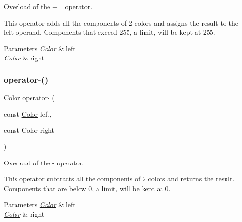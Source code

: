 Overload of the += operator. 

This operator adds all the components of 2 colors and assigns the result to the left operand. Components that exceed 255, a limit, will be kept at 255.


\begin{DoxyParams}{Parameters}
{\em \hyperlink{classjetfuel_1_1draw_1_1Color}{Color}} & left \\
\hline
{\em \hyperlink{classjetfuel_1_1draw_1_1Color}{Color}} & right \\
\hline
\end{DoxyParams}
\mbox{\label{classjetfuel_1_1draw_1_1Color_aa6992ba7435232c7cd36cce08531f343}} 
\subsubsection{\texorpdfstring{operator-\/()}{operator-()}}
{\footnotesize\ttfamily \hyperlink{classjetfuel_1_1draw_1_1Color}{Color} operator-\/ (\begin{DoxyParamCaption}\item[{const \hyperlink{classjetfuel_1_1draw_1_1Color}{Color}}]{left,  }\item[{const \hyperlink{classjetfuel_1_1draw_1_1Color}{Color}}]{right }\end{DoxyParamCaption})\hspace{0.3cm}{\ttfamily [related]}}



Overload of the -\/ operator. 

This operator subtracts all the components of 2 colors and returns the result. Components that are below 0, a limit, will be kept at 0.


\begin{DoxyParams}{Parameters}
{\em \hyperlink{classjetfuel_1_1draw_1_1Color}{Color}} & left \\
\hline
{\em \hyperlink{classjetfuel_1_1draw_1_1Color}{Color}} & right \\
\hline
\end{DoxyParams}
\mbox{\label{classjetfuel_1_1draw_1_1Color_aad218c71ae58d4895e18fb6cd109d91f}} 
